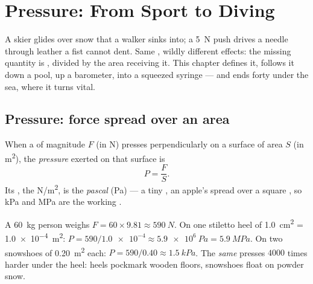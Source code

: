 \chapter{Pressure: From Sport to Diving}\label{ch:g10:pressure}

A skier glides over snow that a walker sinks into; a \qty{5}{N} push
drives a needle through leather a fist cannot dent. Same ,
wildly different effects: the missing quantity is \emph{},
 divided by the area receiving it. This chapter defines it,
follows it down a pool, up a barometer, into a squeezed syringe ---
and ends forty  under the sea, where it turns vital.

\section{Pressure: force spread over an area}

\begin{definition}[Pressure]\label{def:g10:pressure:pressure}
When a  of magnitude $F$ (in \unit{N}) presses perpendicularly on a
surface of area $S$ (in \unit{m^2}), the \emph{pressure}
exerted on that surface is
\[
P = \frac{F}{S}.
\]
Its , the \unit{N/m^2}, is the \emph{pascal}
(\unit{Pa}) --- a tiny , an apple's  spread over a square
, so \unit{kPa} and \unit{MPa} are the working .
\end{definition}

\begin{example}\label{ex:g10:pressure:snowshoe}
A \qty{60}{kg} person weighs $F = 60 \times 9.81 \approx \qty{590}{N}$.
On one stiletto heel of \qty{1.0}{cm^2} = \qty{1.0e-4}{m^2}:
$P = 590/\num{1.0e-4} \approx \qty{5.9e6}{Pa} = \qty{5.9}{MPa}$. On two
snowshoes of \qty{0.20}{m^2} each:
$P = 590/0.40 \approx \qty{1.5}{kPa}$. The \emph{same}  presses
$4000$ times harder under the heel: heels pockmark wooden floors,
snowshoes float on powder snow.
\end{example}


